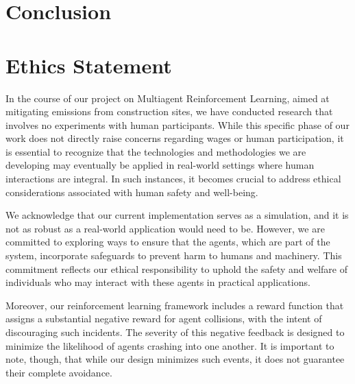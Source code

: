 \documentclass[conference]{IEEEtran}
\begin{document}
\noindent


\section{Conclusion}




\newpage




\newpage

\appendices 
\section{Ethics Statement}
In the course of our project on Multiagent Reinforcement Learning, aimed at mitigating \coo{} emissions
from construction sites, we have conducted research that involves no experiments with human participants.
While this specific phase of our work does not directly raise concerns regarding wages or human
participation, it is essential to recognize that the technologies and methodologies we are developing
may eventually be applied in real-world settings where human interactions are integral. In such instances,
it becomes crucial to address ethical considerations associated with human safety and well-being.

We acknowledge that our current implementation serves as a simulation, and it is not as robust as a
real-world application would need to be. However, we are committed to exploring ways to ensure that the
agents, which are part of the system, incorporate safeguards to prevent harm to humans and machinery.
This commitment reflects our ethical responsibility to uphold the safety and welfare of individuals who
may interact with these agents in practical applications.

Moreover, our reinforcement learning framework includes a reward function that assigns a substantial
negative reward for agent collisions, with the intent of discouraging such incidents. The severity of
this negative feedback is designed to minimize the likelihood of agents crashing into one another. It
is important to note, though, that while our design minimizes such events, it does not guarantee their
complete avoidance.
\end{document}
